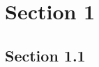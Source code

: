 \documentclass{article}
\begin{document}
\section{Section 1}
\label{sec-1}
\subsection{Section 1.1}\label{sec-11}
\end{document}
